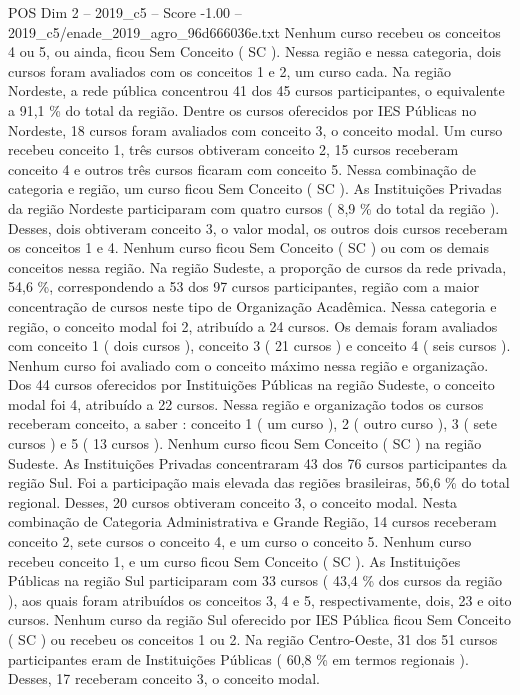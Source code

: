\begin{textsample}{POS Dim 2 – 2019\_c5 – Score -1.00 – 2019\_c5/enade\_2019\_agro\_96d666036e.txt}
Nenhum curso recebeu os conceitos 4 ou 5, ou ainda, ficou Sem Conceito ( SC ).
Nessa região e nessa categoria, dois cursos foram avaliados com os conceitos 1 e 2, um curso cada.
Na região Nordeste, a rede pública concentrou 41 dos 45 cursos participantes, o equivalente a 91,1 \% do total da região.
Dentre os cursos oferecidos por IES Públicas no Nordeste, 18 cursos foram avaliados com conceito 3, o conceito modal.
Um curso recebeu conceito 1, três cursos obtiveram conceito 2, 15 cursos receberam conceito 4 e outros três cursos ficaram com conceito 5.
Nessa combinação de categoria e região, um curso ficou Sem Conceito ( SC ).
As Instituições Privadas da região Nordeste participaram com quatro cursos ( 8,9 \% do total da região ).
Desses, dois obtiveram conceito 3, o valor modal, os outros dois cursos receberam os conceitos 1 e 4.
Nenhum curso ficou Sem Conceito ( SC ) ou com os demais conceitos nessa região.
Na região Sudeste, a proporção de cursos da rede privada, 54,6 \%, correspondendo a 53 dos 97 cursos participantes, região com a maior concentração de cursos neste tipo de Organização Acadêmica.
Nessa categoria e região, o conceito modal foi 2, atribuído a 24 cursos.
Os demais foram avaliados com conceito 1 ( dois cursos ), conceito 3 ( 21 cursos ) e conceito 4 ( seis cursos ).
Nenhum curso foi avaliado com o conceito máximo nessa região e organização.
Dos 44 cursos oferecidos por Instituições Públicas na região Sudeste, o conceito modal foi 4, atribuído a 22 cursos.
Nessa região e organização todos os cursos receberam conceito, a saber : conceito 1 ( um curso ), 2 ( outro curso ), 3 ( sete cursos ) e 5 ( 13 cursos ).
Nenhum curso ficou Sem Conceito ( SC ) na região Sudeste.
As Instituições Privadas concentraram 43 dos 76 cursos participantes da região Sul.
Foi a participação mais elevada das regiões brasileiras, 56,6 \% do total regional.
Desses, 20 cursos obtiveram conceito 3, o conceito modal.
Nesta combinação de Categoria Administrativa e Grande Região, 14 cursos receberam conceito 2, sete cursos o conceito 4, e um curso o conceito 5.
Nenhum curso recebeu conceito 1, e um curso ficou Sem Conceito ( SC ).
As Instituições Públicas na região Sul participaram com 33 cursos ( 43,4 \% dos cursos da região ), aos quais foram atribuídos os conceitos 3, 4 e 5, respectivamente, dois, 23 e oito cursos.
Nenhum curso da região Sul oferecido por IES Pública ficou Sem Conceito ( SC ) ou recebeu os conceitos 1 ou 2.
Na região Centro-Oeste, 31 dos 51 cursos participantes eram de Instituições Públicas ( 60,8 \% em termos regionais ).
Desses, 17 receberam conceito 3, o conceito modal.

\end{textsample}
